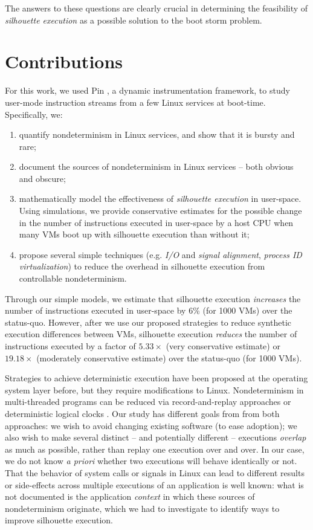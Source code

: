 The answers to these questions are clearly crucial in determining
the feasibility of \emph{silhouette execution} as a possible solution
to the boot storm problem. 

\section{Contributions}
For this work, we used Pin \cite{luk2005pin},
a dynamic instrumentation framework,
to study user-mode instruction streams from 
a few Linux services at boot-time. 
Specifically, we:
\begin {enumerate}
\item quantify nondeterminism in Linux services, and show that it is
  bursty and rare;
\item document the sources of nondeterminism in Linux services -- both obvious and obscure;
\item mathematically model the effectiveness
  of {\em silhouette execution} in user-space. Using simulations, we provide conservative estimates for the possible change in the number of instructions
  executed in user-space by a host CPU when many VMs boot up with silhouette execution than without it;
\item propose several simple techniques (e.g. {\em I/O} and {\em signal alignment}, {\em process ID virtualization})
  to reduce the overhead in silhouette execution from controllable nondeterminism.
\end {enumerate}

Through our simple models, we estimate that silhouette execution {\em increases} the number
of instructions executed in user-space by 6\% (for 1000 VMs) 
over the status-quo. However, after we
use our proposed strategies to reduce synthetic execution differences
between VMs, silhouette execution {\em reduces} the number of instructions executed
by a factor of $5.33\times$ (very conservative estimate) or $19.18\times$ (moderately
conservative estimate) over the status-quo (for 1000 VMs).

Strategies to achieve deterministic execution have been proposed at the operating system layer \cite{bergan2010dos} before,
but they require modifications to Linux. Nondeterminism in multi-threaded programs 
can be reduced via record-and-replay approaches \cite{patil2010pinplay} or deterministic logical clocks \cite{marek2011scaling}. 
Our study has different goals from from both approaches: we wish to avoid changing existing 
software (to ease adoption); we also wish to make several distinct -- and potentially different -- executions \emph{overlap} as much as possible, 
rather than replay one execution over and over.
In our case, we do not know \emph{a priori} whether two executions 
will behave identically or not. That the behavior of system calls or signals in Linux can lead to different results or side-effects across
multiple executions of an application is well known: what is not documented is the application \emph{context} in
which these sources of nondeterminism originate, which we had to investigate to identify
ways to improve silhouette execution. \newline


